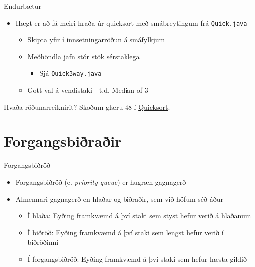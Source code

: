 \documentclass{beamer}
\begin{document}
\begin{frame}{Endurbætur}
\begin{itemize}
 \item Hægt er að fá meiri hraða úr quicksort með smábreytingum frá \texttt{Quick.java}
 \begin{itemize}
  \item Skipta yfir í innsetningarröðun á smáfylkjum
  \item Meðhöndla jafn stór stök sérstaklega
  \begin{itemize}
   \item Sjá \texttt{Quick3way.java}
  \end{itemize}
  \item Gott val á vendistaki - t.d. Median-of-3
 \end{itemize}
\end{itemize}
\end{frame}

\begin{frame}{Hvaða röðunarreiknirit?}
Skoðum glæru 48 í \href{http://algs4.cs.princeton.edu/lectures/23Quicksort.pdf}{Quicksort}.
\end{frame}

\section{Forgangsbiðraðir}

\begin{frame}{Forgangsbiðröð}
\begin{itemize}
 \item Forgangsbiðröð (e. \emph{priority queue}) er hugræn gagnagerð
 \item Almennari gagnagerð en hlaðar og biðraðir, sem við höfum séð áður
 \begin{itemize}
  \item Í hlaða: Eyðing framkvæmd á því staki sem styst hefur verið á hlaðanum
  \item Í biðröð: Eyðing framkvæmd á því staki sem lengst hefur verið í biðröðinni
  \item Í forgangsbiðröð: Eyðing framkvæmd á því staki sem hefur hæsta gildið
 \end{itemize}
\end{itemize}
\end{frame}
\end{document}
